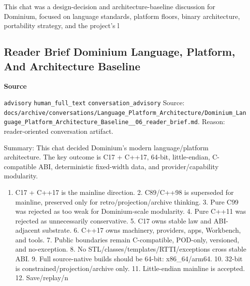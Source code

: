 \documentclass[9pt,a4paper,openany]{book}
\newcommand{\vonecallout}[3]{\par\medskip\noindent\begingroup\setlength{\fboxsep}{7pt}\colorbox{DomCalloutBg}{\parbox{0.94\linewidth}{\textbf{\textcolor{#1}{#2}}\par #3}}\endgroup\par\medskip}
\begin{document}
This chat was a design-\allowbreak{}decision and architecture-\allowbreak{}baseline discussion for Dominium, focused on language standards, platform floors, binary architecture, portability strategy, and the project's l



\subsection{Reader Brief Dominium Language, Platform, And Architecture Baseline}

\vonecallout{DomSlate}{Source}{\texttt{advisory} \texttt{human\_\allowbreak{}full\_\allowbreak{}text} \texttt{conversation\_\allowbreak{}advisory} Source: \texttt{docs/\allowbreak{}archive/\allowbreak{}conversations/\allowbreak{}Language\_\allowbreak{}Platform\_\allowbreak{}Architecture/\allowbreak{}Dominium\_\allowbreak{}Language\_\allowbreak{}Platform\_\allowbreak{}Architecture\_\allowbreak{}Baseline\_\allowbreak{}\_\allowbreak{}06\_\allowbreak{}reader\_\allowbreak{}brief.\allowbreak{}md}.\allowbreak{} Reason: reader-\allowbreak{}oriented conversation artifact.\allowbreak{}}

Summary: This chat decided Dominium's modern language/\allowbreak{}platform architecture.\allowbreak{} The key outcome is C17 + C++17, 64-\allowbreak{}bit, little-\allowbreak{}endian, C-\allowbreak{}compatible ABI, deterministic fixed-\allowbreak{}width data, and provider/\allowbreak{}capability modularity.\allowbreak{}


\begin{enumerate}
\item C17 + C++17 is the mainline direction.\allowbreak{} 2.\allowbreak{} C89/\allowbreak{}C++98 is superseded for mainline, preserved only for retro/\allowbreak{}projection/\allowbreak{}archive thinking.\allowbreak{} 3.\allowbreak{} Pure C99 was rejected as too weak for Dominium-\allowbreak{}scale modularity.\allowbreak{} 4.\allowbreak{} Pure C++11 was rejected as unnecessarily conservative.\allowbreak{} 5.\allowbreak{} C17 owns stable law and ABI-\allowbreak{}adjacent substrate.\allowbreak{} 6.\allowbreak{} C++17 owns machinery, providers, apps, Workbench, and tools.\allowbreak{} 7.\allowbreak{} Public boundaries remain C-\allowbreak{}compatible, POD-\allowbreak{}only, versioned, and no-\allowbreak{}exception.\allowbreak{} 8.\allowbreak{} No STL/\allowbreak{}classes/\allowbreak{}templates/\allowbreak{}RTTI/\allowbreak{}exceptions cross stable ABI.\allowbreak{} 9.\allowbreak{} Full source-\allowbreak{}native builds should be 64-\allowbreak{}bit: x86\_\allowbreak{}64/\allowbreak{}arm64.\allowbreak{} 10.\allowbreak{} 32-\allowbreak{}bit is constrained/\allowbreak{}projection/\allowbreak{}archive only.\allowbreak{} 11.\allowbreak{} Little-\allowbreak{}endian mainline is accepted.\allowbreak{} 12.\allowbreak{} Save/\allowbreak{}replay/\allowbreak{}n
\end{enumerate}
\end{document}
